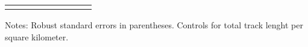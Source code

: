 \begin{table}[H]
{\begin{threeparttable}
\begin{tabular}{lcccccccc}
\bottomrule[0.5pt]                                                                               \label{tab:table2}                                                                       \end{tabular}                                                                                                    \vspace{-13pt}                                                                                           \begin{tablenotes}[flushleft]{\setlength{\itemindent}{-3pt}}          \small                                                                                                           \item Notes: Robust standard errors in   parentheses. Controls for total track lenght per square kilometer.            \end{tablenotes}                                                                                         \end{threeparttable}                                                                             }                                                                                                                        \end{table}
